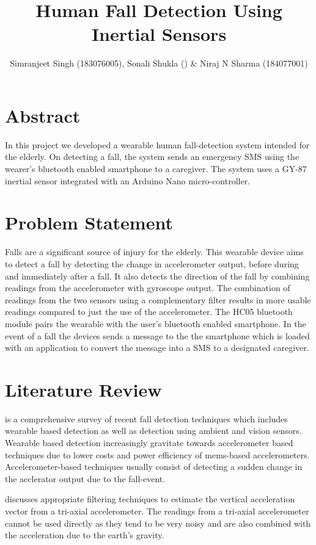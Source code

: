 \documentclass[11pt, a4paper]{article}
\title{Human Fall Detection Using Inertial Sensors}
\author{Simranjeet Singh (183076005), Sonali Shukla () \& Niraj N Sharma (184077001)}
\begin{document}
\maketitle
\section*{Abstract}
In this project we developed a wearable human fall-detection system
intended for the elderly. On detecting a fall, the system sends an
emergency SMS using the wearer's bluetooth enabled smartphone to a
caregiver. The system uses a GY-87 inertial sensor integrated with an
Arduino Nano micro-controller.

\section{Problem Statement}
Falls are a significant source of injury for the elderly. This wearable
device aims to detect a fall by detecting the change in accelerometer
output, before during and immediately after a fall. It also detects the
direction of the fall by combining readings from the accelerometer with
gyroscope output. The combination of readings from the two sensors using a
complementary filter results in more usable readings compared to
just the use of the accelerometer. The HC05 bluetooth module pairs the
wearable with the user's bluetooth enabled smartphone. In the event of a
fall the devices sends a message to the the smartphone which is loaded
with an application to convert the message into a SMS to a designated
caregiver.

\section{Literature Review}
\cite{Mubashir2013} is a comprehensive survey of recent fall detection
techniques which includes wearable based detection as well as detection
using ambient and vision sensors. Wearable based detection increasingly
gravitate towards accelerometer based techniques due to lower costs and
power efficiency of mems-based accelerometers. Accelerometer-based techniques usually consist of detecting a sudden change in the
acclerator output due to the fall-event.

\cite{Bourke2011} discusses appropriate filtering techniques to estimate
the vertical acceleration vector from a tri-axial accelerometer. The
readings from a tri-axial accelerometer cannot be used directly as they
tend to be very noisy and are also combined with the acceleration due to
the earth's gravity.
\end{document}
